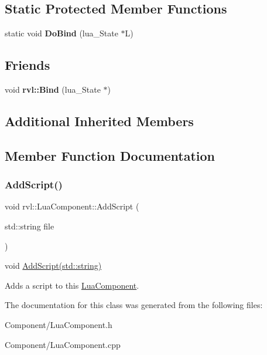 \subsection*{Static Protected Member Functions}
\begin{DoxyCompactItemize}
\item 
\mbox{\label{classrvl_1_1_lua_component_a9cc4df52d18fd0cf0264d1693de213ff}} 
static void {\bfseries Do\+Bind} (lua\+\_\+\+State $\ast$L)
\end{DoxyCompactItemize}
\subsection*{Friends}
\begin{DoxyCompactItemize}
\item 
\mbox{\label{classrvl_1_1_lua_component_a522dc2cb88846673d8069d41e7bba7e8}} 
void {\bfseries rvl\+::\+Bind} (lua\+\_\+\+State $\ast$)
\end{DoxyCompactItemize}
\subsection*{Additional Inherited Members}


\subsection{Member Function Documentation}
\mbox{\label{classrvl_1_1_lua_component_a677b4674695a2455b2e23f0310884d82}} 
\subsubsection{\texorpdfstring{Add\+Script()}{AddScript()}}
{\footnotesize\ttfamily void rvl\+::\+Lua\+Component\+::\+Add\+Script (\begin{DoxyParamCaption}\item[{std\+::string}]{file }\end{DoxyParamCaption})}



void \hyperlink{classrvl_1_1_lua_component_a677b4674695a2455b2e23f0310884d82}{Add\+Script(std\+::string)} 

Adds a script to this \hyperlink{classrvl_1_1_lua_component}{Lua\+Component}. 

The documentation for this class was generated from the following files\+:\begin{DoxyCompactItemize}
\item 
Component/Lua\+Component.\+h\item 
Component/Lua\+Component.\+cpp\end{DoxyCompactItemize}
